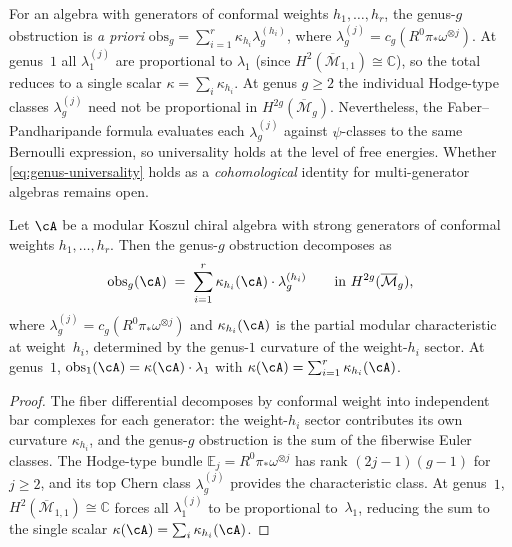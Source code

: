 \begin{remark}\label{rem:multi-generator-obs}
For an algebra with generators of conformal weights $h_1, \ldots, h_r$,
the genus-$g$ obstruction is \emph{a priori}
$\mathrm{obs}_g = \sum_{i=1}^r \kappa_{h_i} \lambda_g^{(h_i)}$,
where $\lambda_g^{(j)} = c_g(R^0\pi_*\omega^{\otimes j})$.
At genus~$1$ all $\lambda_1^{(j)}$ are proportional to $\lambda_1$
(since $H^2(\overline{\mathcal{M}}_{1,1}) \cong \mathbb{C}$),
so the total reduces to a single scalar $\kappa = \sum_i \kappa_{h_i}$.
At genus $g \geq 2$ the individual Hodge-type classes $\lambda_g^{(j)}$
need not be proportional in $H^{2g}(\overline{\mathcal{M}}_g)$.
Nevertheless, the Faber--Pandharipande formula evaluates each
$\lambda_g^{(j)}$ against $\psi$-classes to the same Bernoulli expression,
so universality holds at the level of free energies.
Whether \eqref{eq:genus-universality} holds as a \emph{cohomological} identity
for multi-generator algebras remains open.
\end{remark}

\begin{proposition}
\label{prop:multi-generator-obstruction}
Let $\cA$ be a modular Koszul chiral algebra with strong generators
of conformal weights $h_1, \ldots, h_r$.
Then the genus-$g$ obstruction decomposes as
\begin{equation}\label{eq:multi-generator-decomp}
\mathrm{obs}_g(\cA) \;=\;
\sum_{i=1}^{r} \kappa_{h_i}(\cA) \cdot \lambda_g^{(h_i)}
\qquad \text{in } H^{2g}(\overline{\mathcal{M}}_g),
\end{equation}
where $\lambda_g^{(j)} = c_g(R^0\pi_*\omega^{\otimes j})$ and
$\kappa_{h_i}(\cA)$ is the partial modular characteristic at
weight~$h_i$, determined by the genus-$1$ curvature of the
weight-$h_i$ sector.  At genus~$1$,
$\mathrm{obs}_1(\cA) = \kappa(\cA) \cdot \lambda_1$
with $\kappa(\cA) = \sum_{i=1}^r \kappa_{h_i}(\cA)$.
\end{proposition}

\begin{proof}
The fiber differential decomposes by conformal weight into
independent bar complexes for each generator: the weight-$h_i$
sector contributes its own curvature $\kappa_{h_i}$, and the
genus-$g$ obstruction is the sum of the fiberwise Euler classes.
The Hodge-type bundle $\mathbb{E}_j = R^0\pi_*\omega^{\otimes j}$
has rank $(2j-1)(g-1)$ for $j \geq 2$, and its top Chern class
$\lambda_g^{(j)}$ provides the characteristic class.
At genus~$1$, $H^2(\overline{\mathcal{M}}_{1,1}) \cong \mathbb{C}$
forces all $\lambda_1^{(j)}$ to be proportional to~$\lambda_1$,
reducing the sum to the single scalar
$\kappa(\cA) = \sum_i \kappa_{h_i}(\cA)$.
\end{proof}

